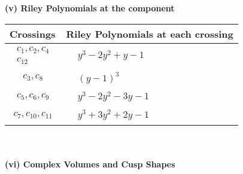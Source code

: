 \documentclass[1p]{elsarticle_modified}
\theoremstyle{definition}
\begin{document}
\newpage\renewcommand{\arraystretch}{1}
\flushleft \textbf{(v) Riley Polynomials at the component}\newline \\
\begin{tabular}{m{50pt}|m{274pt}}
Crossings & \hspace{64pt}Riley Polynomials at each crossing \\
\hline $$\begin{aligned}c_{1},c_{2},c_{4}\\c_{12}\end{aligned}$$&$\begin{aligned}
&y^3-2 y^2+y-1
\end{aligned}$\\
\hline $$\begin{aligned}c_{3},c_{8}\end{aligned}$$&$\begin{aligned}
&(y-1)^3
\end{aligned}$\\
\hline $$\begin{aligned}c_{5},c_{6},c_{9}\end{aligned}$$&$\begin{aligned}
&y^3-2 y^2-3 y-1
\end{aligned}$\\
\hline $$\begin{aligned}c_{7},c_{10},c_{11}\end{aligned}$$&$\begin{aligned}
&y^3+3 y^2+2 y-1
\end{aligned}$\\
\hline
\end{tabular}\\~\\
\newpage\flushleft \textbf{(vi) Complex Volumes and Cusp Shapes}
\end{document}
